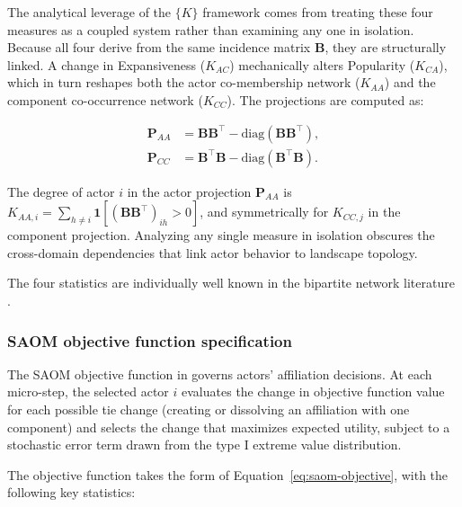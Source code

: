 \documentclass[
  article]{jss}
\begin{document}
The analytical leverage of the \(\{K\}\) framework comes from treating
these four measures as a coupled system rather than examining any one in
isolation. Because all four derive from the same incidence matrix
\(\mathbf{B}\), they are structurally linked. A change in Expansiveness
(\(K_{AC}\)) mechanically alters Popularity (\(K_{CA}\)), which in turn
reshapes both the actor co-membership network (\(K_{AA}\)) and the
component co-occurrence network (\(K_{CC}\)). The projections are
computed as:

\begin{align}
\mathbf{P}_{AA} &= \mathbf{B} \mathbf{B}^\top - \text{diag}(\mathbf{B} \mathbf{B}^\top), \label{eq:proj-actor} \\
\mathbf{P}_{CC} &= \mathbf{B}^\top \mathbf{B} - \text{diag}(\mathbf{B}^\top \mathbf{B}). \label{eq:proj-component}
\end{align}

The degree of actor \(i\) in the actor projection \(\mathbf{P}_{AA}\) is
\(K_{AA,i}
= \sum_{h \neq i} \mathbf{1}[(\mathbf{B}\mathbf{B}^\top)_{ih} > 0]\),
and symmetrically for \(K_{CC,j}\) in the component projection.
Analyzing any single measure in isolation obscures the cross-domain
dependencies that link actor behavior to landscape topology.

The four statistics are individually well known in the bipartite network
literature \citep{Latapy2008, BorgattiEverett1997}.

\subsubsection{SAOM objective function
specification}\label{sec:objective}

The SAOM objective function in  governs actors'
affiliation decisions. At each micro-step, the selected actor \(i\)
evaluates the change in objective function value for each possible tie
change (creating or dissolving an affiliation with one component) and
selects the change that maximizes expected utility, subject to a
stochastic error term drawn from the type I extreme value distribution.

The objective function takes the form of
Equation~\ref{eq:saom-objective}, with the following key statistics:
\end{document}

